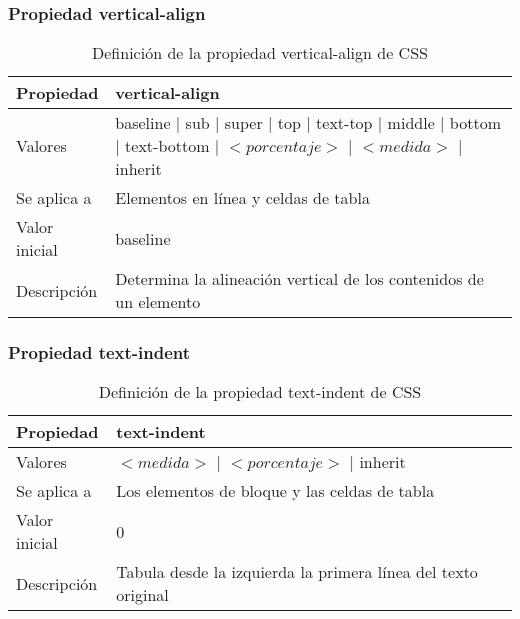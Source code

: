 \begin{frame}
\frametitle{Propiedad vertical-align}

\begin{center}
  \begin{table}
   \begin{tabular}{p{1.8cm}p{7.8cm}}
Propiedad & \bf{vertical-align} \\ \hline
Valores& baseline | sub | super | top | text-top | middle | bottom | text-bottom | $<porcentaje>$ | $<medida>$ | inherit \\ \hline
Se aplica a& Elementos en línea y celdas de tabla \\ \hline
Valor inicial& baseline \\ \hline
Descripción& Determina la alineación vertical de los contenidos de un elemento \\ \hline
  \end{tabular}
   \caption{Definición de la propiedad vertical-align de CSS}
 \end{table}
\end{center}


\end{frame}



\begin{frame}
\frametitle{Propiedad text-indent}

\begin{center}
  \begin{table}
   \begin{tabular}{p{1.8cm}p{7.8cm}}
Propiedad & \bf{text-indent} \\ \hline
Valores& $<medida>$ | $<porcentaje>$ | inherit \\ \hline
Se aplica a& Los elementos de bloque y las celdas de tabla \\ \hline
Valor inicial& 0 \\ \hline
Descripción& Tabula desde la izquierda la primera línea del texto original \\ \hline
  \end{tabular}
   \caption{Definición de la propiedad text-indent de CSS}
 \end{table}
\end{center}


\end{frame}



